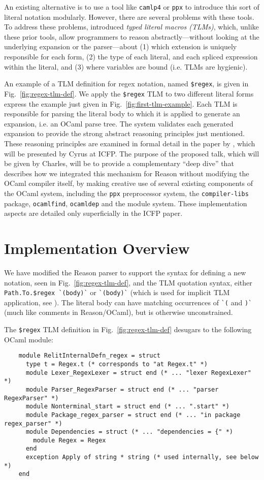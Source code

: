 \documentclass[acmsmall,review]{acmart}
\newcommand{\li}[1]{\lstinline[basicstyle=\ttfamily\fontsize{9pt}{1em}\selectfont]{#1}}
\theoremstyle{slplain}
\numberwithin{thm}{section}
\begin{document}
An existing alternative is to use a tool like \li{camlp4} or \li{ppx} to introduce this sort of literal notation modularly. However, there are several problems with these tools. To address these problems, \citet{TLMs-paper} introduced \emph{typed literal macros (TLMs)}, which, unlike these prior tools, allow programmers to reason abstractly---without looking at the underlying expansion or the parser---about (1) which extension is uniquely responsible for each form, (2) the type of each literal, and each spliced expression within the literal, and (3) where variables are bound (i.e. TLMs are hygienic).

An example of a TLM definition for regex notation, named \li{$regex}, is given in Fig.~\ref{fig:regex-tlm-def}. We apply the \li{$regex} TLM to two different literal forms express 
the example just given in Fig.~\ref{fig:first-tlm-example}. Each TLM is responsible for parsing the literal body to which it is applied to generate an expansion, i.e. an OCaml parse tree. The system validates each generated expansion to provide the strong abstract reasoning principles just mentioned. These reasoning principles are examined in formal detail in the paper by \citet{TLMs-paper}, which will be presented by Cyrus at ICFP. The purpose of the proposed talk, which will be given by Charles, will be to provide a complementary ``deep dive'' that describes how we integrated this mechanism for Reason without modifying the OCaml compiler itself, by making creative use of several existing components of the OCaml system, including the \li{ppx} preprocessor system, the \li{compiler-libs} package, \li{ocamlfind}, \li{ocamldep} and the module system. These implementation aspects are detailed only superficially in the ICFP paper.


\section{Implementation Overview}

We have modified the Reason parser to support the syntax for defining a new notation, seen in Fig.~\ref{fig:regex-tlm-def}, and the TLM quotation syntax, either \li{Path.To.$regex `(body)`} or \li{`(body)`} (which is used for implicit TLM application, see \cite{TLMs-paper}). The literal body can have matching occurrences of \li{`(} and \li{)`} (much like comments in Reason/OCaml), but is otherwise unconstrained.

The \li{$regex} TLM definition in Fig.~\ref{fig:regex-tlm-def} desugars to the following OCaml module:
\begin{lstlisting}
    module RelitInternalDefn_regex = struct
      type t = Regex.t (* corresponds to "at Regex.t" *)
      module Lexer_RegexLexer = struct end (* ... "lexer RegexLexer" *)
      module Parser_RegexParser = struct end (* ... "parser RegexParser" *)
      module Nonterminal_start = struct end (* ... ".start" *)
      module Package_regex_parser = struct end (* ... "in package regex_parser" *)
      module Dependencies = struct (* ... "dependencies = {" *)
        module Regex = Regex
      end
      exception Apply of string * string (* used internally, see below *)
    end
\end{lstlisting}
\end{document}
